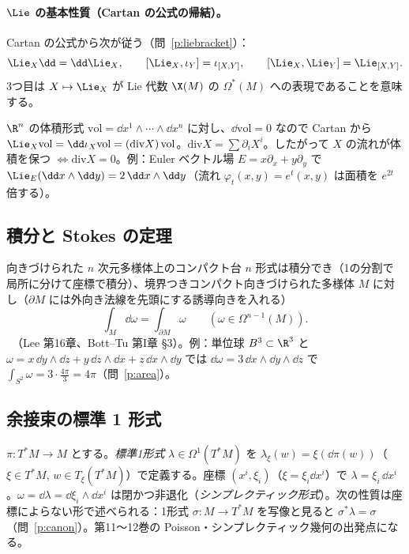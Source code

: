\paragraph{$\Lie$ の基本性質（Cartan の公式の帰結）。}Cartan の公式から次が従う（問~\ref{p:liebracket}）：
\[
\Lie_X\dd=\dd\Lie_X,\qquad[\Lie_X,\iota_Y]=\iota_{[X,Y]},\qquad[\Lie_X,\Lie_Y]=\Lie_{[X,Y]}.
\]
3つ目は $X\mapsto\Lie_X$ が Lie 代数 $\X(M)$ の $\Omega^*(M)$ への表現であることを意味する。

\begin{ex}[体積形式と発散]\label{ex:div}
$\R^n$ の体積形式 $\mathrm{vol}=\dd x^1\wedge\cdots\wedge\dd x^n$ に対し、$\dd\mathrm{vol}=0$ なので Cartan から $\Lie_X\mathrm{vol}=\dd\iota_X\mathrm{vol}=(\mathrm{div}X)\,\mathrm{vol}$。$\mathrm{div}X=\sum\partial_iX^i$。したがって $X$ の流れが体積を保つ $\Leftrightarrow\mathrm{div}X=0$。例：Euler ベクトル場 $E=x\partial_x+y\partial_y$ で $\Lie_E(\dd x\wedge\dd y)=2\,\dd x\wedge\dd y$（流れ $\varphi_t(x,y)=e^t(x,y)$ は面積を $e^{2t}$ 倍する）。
\end{ex}

\subsection{積分と Stokes の定理}
向きづけられた $n$ 次元多様体上のコンパクト台 $n$ 形式は積分でき（1の分割で局所に分けて座標で積分）、境界つきコンパクト向きづけられた多様体 $M$ に対し（$\partial M$ には外向き法線を先頭にする誘導向きを入れる）
\[
\int_M\dd\omega=\int_{\partial M}\omega\qquad(\omega\in\Omega^{n-1}(M)).
\]
\tC\ （Lee 第16章、Bott--Tu 第I章 §3）。例：単位球 $B^3\subset\R^3$ と $\omega=x\,\dd y\wedge\dd z+y\,\dd z\wedge\dd x+z\,\dd x\wedge\dd y$ では $\dd\omega=3\,\dd x\wedge\dd y\wedge\dd z$ で $\int_{S^2}\omega=3\cdot\tfrac{4\pi}3=4\pi$（問~\ref{p:area}）。

\subsection{余接束の標準 1 形式}
$\pi:T^*M\to M$ とする。\emph{標準1形式} $\lambda\in\Omega^1(T^*M)$ を $\lambda_\xi(w)=\xi(\dd\pi(w))$（$\xi\in T^*M$, $w\in T_\xi(T^*M)$）で定義する。座標 $(x^i,\xi_i)$（$\xi=\xi_i\dd x^i$）で $\lambda=\xi_i\,\dd x^i$。$\omega=\dd\lambda=\dd\xi_i\wedge\dd x^i$ は閉かつ非退化（\emph{シンプレクティック形式}）。次の性質は座標によらない形で述べられる：1形式 $\sigma:M\to T^*M$ を写像と見ると $\sigma^*\lambda=\sigma$（問~\ref{p:canon}）。第11〜12巻の Poisson・シンプレクティック幾何の出発点になる。

